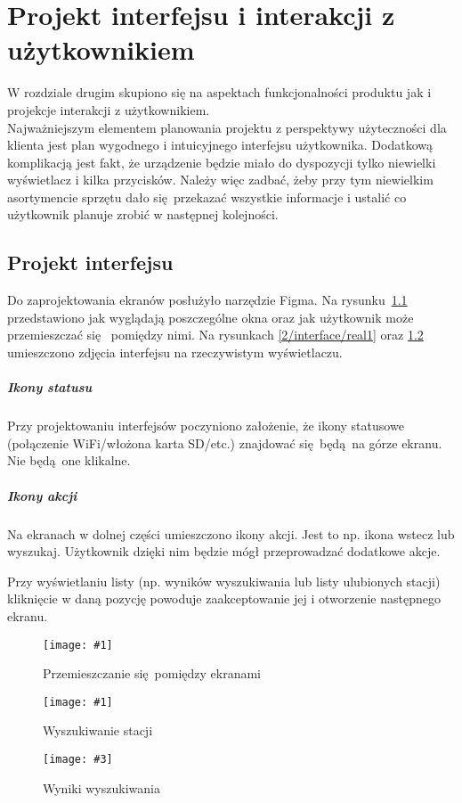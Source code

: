 \documentclass[12pt]{report}
\newcommand{\imgint}[4]{
	\begin{figure}[{#4}]
		\centering
		\texttt{[image: \#1]}
		\caption{#2}
		\label{#1}
	\end{figure}
}
\newcommand{\imgcs}[3]{\imgint{#1}{#2}{#3}{}}
\newcommand{\imgintss}[5]{
	\begin{figure}[{#5}]
		\centering
		\begin{minipage}{.45\textwidth}
			\centering
			\texttt{[image: \#1]}
			\caption{#2}
			\label{#1}
		\end{minipage}%
		\hfill
		\begin{minipage}{.45\textwidth}
			\centering
			\texttt{[image: \#3]}
			\caption{#4}
			\label{#3}
		\end{minipage}
	\end{figure}
}
\newcommand{\imgss}[4]{\imgintss{#1}{#2}{#3}{#4}{}}
\begin{document}
	\chapter{Projekt interfejsu i interakcji z użytkownikiem}
	W rozdziale drugim skupiono się na aspektach funkcjonalności produktu jak i projekcje interakcji z użytkownikiem.\\
	
	Najważniejszym elementem planowania projektu z perspektywy użyteczności dla klienta jest plan wygodnego i intuicyjnego interfejsu użytkownika. Dodatkową komplikacją jest fakt, że urządzenie będzie miało do dyspozycji tylko niewielki wyświetlacz i kilka przycisków. Należy więc zadbać, żeby przy tym niewielkim asortymencie sprzętu dało się przekazać wszystkie informacje i ustalić co użytkownik planuje zrobić w następnej kolejności.
		
	\section{Projekt interfejsu}
		Do zaprojektowania ekranów posłużyło narzędzie Figma\textsuperscript{\cite{figma}}. Na rysunku~\ref{2/interface/all} przedstawiono jak wyglądają poszczególne okna oraz jak użytkownik może przemieszczać się  pomiędzy nimi. Na rysunkach \ref{2/interface/real1} oraz \ref{2/interface/real2} umieszczono zdjęcia interfejsu na rzeczywistym wyświetlaczu.
		
		\paragraph{Ikony statusu}
			Przy projektowaniu interfejsów poczyniono założenie, że ikony statusowe (połączenie WiFi/włożona karta SD/etc.) znajdować się będą na górze ekranu. Nie będą one klikalne.
			
		\paragraph{Ikony akcji}
			Na ekranach w dolnej części umieszczono ikony akcji. Jest to np. ikona wstecz lub wyszukaj. Użytkownik dzięki nim będzie mógł przeprowadzać dodatkowe akcje.
		
		$ $\\
		Przy wyświetlaniu listy (np. wyników wyszukiwania lub listy ulubionych stacji) kliknięcie w daną pozycję powoduje zaakceptowanie jej i otworzenie następnego ekranu.

		\imgcs{2/interface/all}{Przemieszczanie się pomiędzy ekranami}{0.9}
		\imgss{2/interface/real1}{Wyszukiwanie stacji}{2/interface/real2}{Wyniki wyszukiwania}
	
\end{document}
